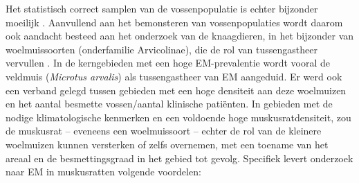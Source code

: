 \documentclass[twoside]{extreport}
\begin{document}
Het statistisch correct samplen van de vossenpopulatie is echter
bijzonder moeilijk \citep{tackmann1998spatial, conraths2003statistics}.
Aanvullend aan het bemonsteren van vossenpopulaties wordt daarom ook
aandacht besteed aan het onderzoek van de knaagdieren, in het bijzonder
van woelmuissoorten (onderfamilie Arvicolinae), die de rol van
tussengastheer vervullen \citep{umhang2013nutrias}. In de kerngebieden
met een hoge EM-prevalentie wordt vooral de veldmuis (\emph{Microtus
arvalis}) als tussengastheer van EM aangeduid. Er werd ook een verband
gelegd tussen gebieden met een hoge densiteit aan deze woelmuizen en het
aantal besmette vossen/aantal klinische patiënten. In gebieden met de
nodige klimatologische kenmerken en een voldoende hoge
muskusratdensiteit, zou de muskusrat -- eveneens een woelmuissoort --
echter de rol van de kleinere woelmuizen kunnen versterken of zelfs
overnemen, met een toename van het areaal en de besmettingsgraad in het
gebied tot gevolg. Specifiek levert onderzoek naar EM in muskusratten
volgende voordelen:
\end{document}
